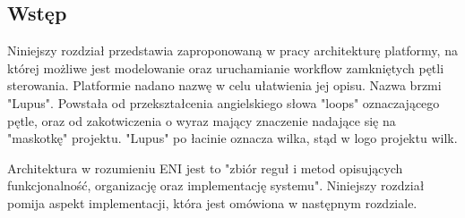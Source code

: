 \subsection{Wstęp}

Niniejszy rozdział przedstawia zaproponowaną w pracy architekturę  platformy, na której możliwe jest modelowanie oraz uruchamianie workflow zamkniętych pętli sterowania. Platformie nadano nazwę w celu ułatwienia jej opisu. Nazwa brzmi "Lupus". Powstała od przekształcenia angielskiego słowa "loops" oznaczającego pętle, oraz od zakotwiczenia o wyraz mający znaczenie nadające się na "maskotkę" projektu. "Lupus" po łacinie oznacza wilka, stąd w logo projektu wilk. 

Architektura w rozumieniu ENI jest to "zbiór reguł i metod opisujących funkcjonalność, organizację oraz implementację systemu". Niniejszy rozdział pomija aspekt implementacji, która jest omówiona w następnym rozdziale.

